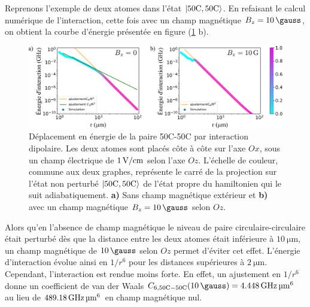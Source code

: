 Reprenons l'exemple de deux atomes dans l'état $\ket{\mathrm{50C,50C}}$.
En refaisant le calcul numérique de l'interaction, cette fois avec un champ magnétique $B_z=\SI{10}{\gauss}$, on obtient la courbe d'énergie présentée en figure (\ref{fig:VdW_50C50C_1Vcm_10G} b).
%
\begin{figure}[h]
\centering
\includegraphics[width=\linewidth]{figures/circsim/VdW_50C50C_1Vcm_0_10G}
\caption[Interaction dipolaire 50C-50C en présence d'un champ magnétique]{
Déplacement en énergie de la paire 50C-50C par interaction dipolaire.
Les deux atomes sont placés côte à côte sur l'axe $Ox$, sous un champ électrique de $\SIvv{1}{\V / \cm}$ selon l'axe $Oz$. L'échelle de couleur, commune aux deux graphes, représente le carré de la projection sur l'état non perturbé $\ket{50\text{C},50\text{C}}$ de l'état propre du hamiltonien qui le suit adiabatiquement.
\textbf{a)} Sans champ magnétique extérieur et \textbf{b)} avec un champ magnétique $B_z = \SI{10}{\gauss}$ selon $Oz$.
}
\label{fig:VdW_50C50C_1Vcm_10G}
\end{figure}
%
Alors qu'en l'absence de champ magnétique le niveau de paire circulaire-circulaire était perturbé dès que la distance entre les deux atomes était inférieure à $\SI{10}{\um}$, un champ magnétique de $\SI{10}{\gauss}$ selon $Oz$ permet d'éviter cet effet.
L'énergie d'interaction évolue ainsi en $1/r^6$ pour les distances supérieures à $\SI{2}{\um}$.
Cependant, l'interaction est rendue moins forte.
En effet, un ajustement en $1/r^6$ donne un coefficient de van der Waals $C_{6,\mathrm{50C-50C}}(\SI{10}{\gauss}) = \SI{4.448}{\GHz\raiseto{6}\um}$ au lieu de $\SI{489.18}{\GHz\raiseto{6}\um}$ en champ magnétique nul.
